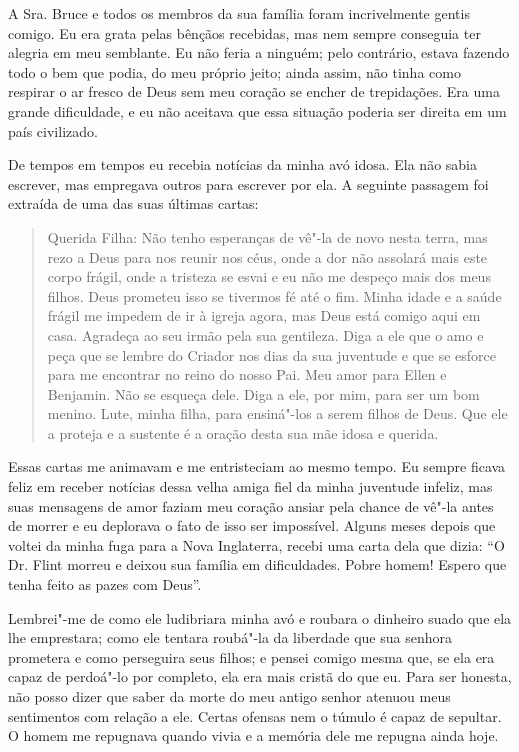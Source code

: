 A Sra. Bruce e todos os membros da sua
família foram incrivelmente gentis comigo. Eu era grata pelas bênçãos
recebidas, mas nem sempre conseguia ter alegria em meu semblante. Eu não
feria a ninguém; pelo contrário, estava fazendo todo o bem que podia, do
meu próprio jeito; ainda assim, não tinha como respirar o ar fresco de
Deus sem meu coração se encher de trepidações. Era uma grande
dificuldade, e eu não aceitava que essa situação poderia ser direita em
um país civilizado.

De tempos em tempos eu recebia notícias
da minha avó idosa. Ela não sabia escrever, mas empregava outros para
escrever por ela. A seguinte passagem foi extraída de uma das suas
últimas cartas:

\begin{quote}
Querida Filha: Não tenho esperanças de vê"-la de novo nesta terra, mas
rezo a Deus para nos reunir nos céus, onde a dor não assolará mais este
corpo frágil, onde a tristeza se esvai e eu não me despeço mais dos meus
filhos. Deus prometeu isso se tivermos fé até o fim. Minha idade e a
saúde frágil me impedem de ir à igreja agora, mas Deus está comigo aqui
em casa. Agradeça ao seu irmão pela sua gentileza. Diga a ele que o amo
e peça que se lembre do Criador nos dias da sua juventude e que se
esforce para me encontrar no reino do nosso Pai. Meu amor para Ellen e
Benjamin. Não se esqueça dele. Diga a ele, por mim, para ser um bom
menino. Lute, minha filha, para ensiná"-los a serem filhos de Deus. Que
ele a proteja e a sustente é a oração desta sua mãe idosa e querida.
\end{quote}

Essas cartas me animavam e me
entristeciam ao mesmo tempo. Eu sempre ficava feliz em receber notícias
dessa velha amiga fiel da minha juventude infeliz, mas suas mensagens de
amor faziam meu coração ansiar pela chance de vê"-la antes de morrer e eu
deplorava o fato de isso ser impossível. Alguns meses depois que voltei
da minha fuga para a Nova Inglaterra, recebi uma carta dela que dizia:
``O Dr. Flint morreu e deixou sua família em dificuldades. Pobre homem!
Espero que tenha feito as pazes com Deus''.

Lembrei"-me de como ele ludibriara minha
avó e roubara o dinheiro suado que ela lhe emprestara; como ele tentara
roubá"-la da liberdade que sua senhora prometera e como perseguira seus
filhos; e pensei comigo mesma que, se ela era capaz de perdoá"-lo por
completo, ela era mais cristã do que eu. Para ser honesta, não posso
dizer que saber da morte do meu antigo senhor atenuou meus sentimentos
com relação a ele. Certas ofensas nem o túmulo é capaz de sepultar. O
homem me repugnava quando vivia e a memória dele me repugna ainda hoje.

